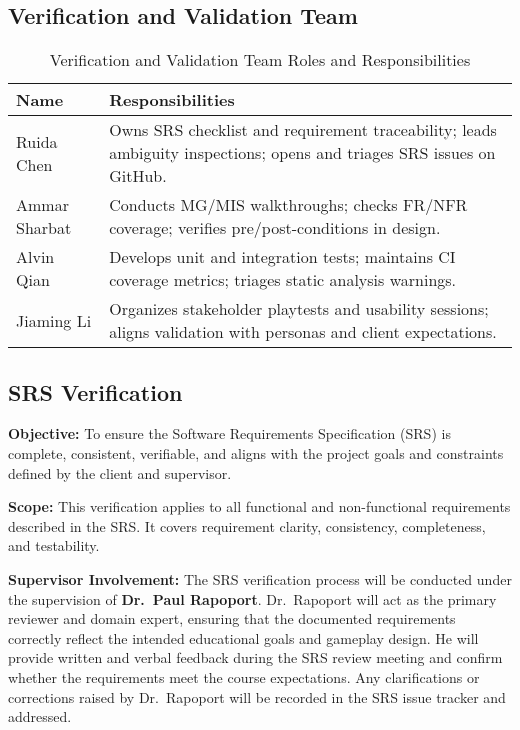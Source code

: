 \documentclass[12pt, titlepage]{article}
\begin{document}
\subsection{Verification and Validation Team}

\begin{table}[H]
\centering
\caption{Verification and Validation Team Roles and Responsibilities}
\label{tab:vvteam}
\begin{tabularx}{\textwidth}{lX}
\toprule
\textbf{Name} & \textbf{Responsibilities} \\
\midrule
Ruida Chen & Owns SRS checklist and requirement traceability; leads ambiguity inspections; opens and triages SRS issues on GitHub. \\
Ammar Sharbat & Conducts MG/MIS walkthroughs; checks FR/NFR coverage; verifies pre/post-conditions in design. \\
Alvin Qian & Develops unit and integration tests; maintains CI coverage metrics; triages static analysis warnings. \\
Jiaming Li & Organizes stakeholder playtests and usability sessions; aligns validation with personas and client expectations. \\
\bottomrule
\end{tabularx}
\end{table}

\subsection{SRS Verification}
\textbf{Objective:}  
To ensure the Software Requirements Specification (SRS) is complete, consistent, verifiable, and aligns with the project goals and constraints defined by the client and supervisor.

\noindent \textbf{Scope:}  
This verification applies to all functional and non-functional requirements described in the SRS. It covers requirement clarity, consistency, completeness, and testability.  

\noindent \textbf{Supervisor Involvement:}  
The SRS verification process will be conducted under the supervision of \textbf{Dr.\ Paul Rapoport}.  
Dr.\ Rapoport will act as the primary reviewer and domain expert, ensuring that the documented requirements correctly reflect the intended educational goals and gameplay design.  
He will provide written and verbal feedback during the SRS review meeting and confirm whether the requirements meet the course expectations.  
Any clarifications or corrections raised by Dr.\ Rapoport will be recorded in the SRS issue tracker and addressed.
\end{document}
